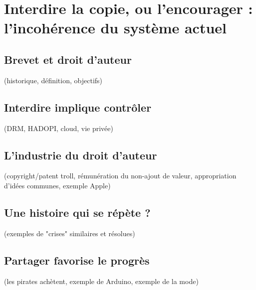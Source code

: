 \chapter{Interdire la copie, ou l'encourager : l'incohérence du système actuel}

\section{Brevet et droit d'auteur}
(historique, définition, objectifs)
\section{Interdire implique contrôler} %
(DRM, HADOPI, cloud, vie privée)
\section{L'industrie du droit d'auteur}
(copyright/patent troll, rémunération du non-ajout de valeur, appropriation d'idées communes, exemple Apple)
\section{Une histoire qui se répète ?}
(exemples de "crises" similaires et résolues)
\section{Partager favorise le progrès}
(les pirates achètent, exemple de Arduino, exemple de la mode)
